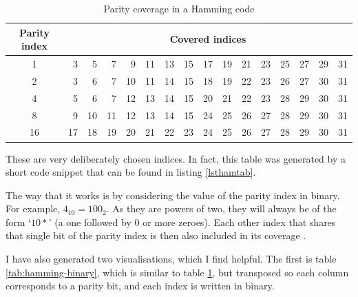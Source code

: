 \documentclass[a4paper,11pt]{article}
\begin{document}
\begin{table}[H]
\begin{center}
    \begin{tabular}{crrrrrrrrrrrrrrr}
    \toprule
    Parity index & \multicolumn{15}{c}{Covered indices} \\
    \midrule
    1 & 3 & 5 & 7 & 9 & 11 & 13 & 15 & 17 & 19 & 21 & 23 & 25 & 27 & 29 & 31 \\
    2 & 3 & 6 & 7 & 10 & 11 & 14 & 15 & 18 & 19 & 22 & 23 & 26 & 27 & 30 & 31 \\
    4 & 5 & 6 & 7 & 12 & 13 & 14 & 15 & 20 & 21 & 22 & 23 & 28 & 29 & 30 & 31 \\
    8 & 9 & 10 & 11 & 12 & 13 & 14 & 15 & 24 & 25 & 26 & 27 & 28 & 29 & 30 & 31 \\
    16 & 17 & 18 & 19 & 20 & 21 & 22 & 23 & 24 & 25 & 26 & 27 & 28 & 29 & 30 & 31 \\
    \bottomrule
    \end{tabular}
    \caption{Parity coverage in a Hamming code}\label{tabhammingindices}
\end{center}
\end{table}

    These are very deliberately chosen indices. In fact, this table was
    generated by a short code snippet that can be found in listing
    \ref{lsthamtab}.

    The way that it works is by considering the value of the parity index in
    binary. For example, $4_{10}=100_{2}$. As they are powers of two, they will
    always be of the form `$10*$' (a one followed by 0 or more zeroes). Each
    other index that shares that single bit of the parity index is then also
    included in its coverage \cite{Codes1950Hamming}.

    I have also generated two visualisations, which I find helpful. The first is
    table \ref{tab:hamming-binary}, which is similar to table
    \ref{tabhammingindices}, but transposed so each column corresponds to a
    parity bit, and each index is written in binary.
\end{document}
